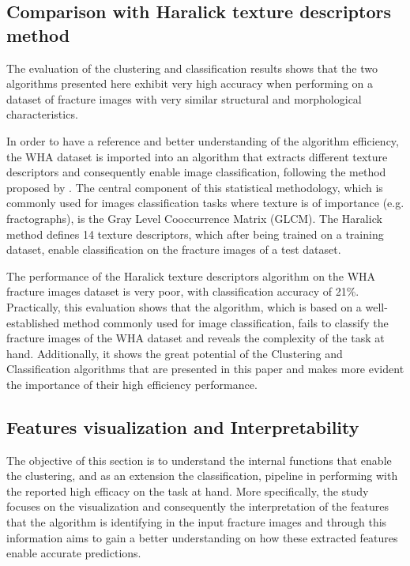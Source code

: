 \documentclass[authoryear,preprint,review,12pt, singleside]{elsarticle}
\begin{document}
\subsection{Comparison with Haralick texture descriptors method}

The evaluation of the clustering and classification results shows that the two algorithms presented here exhibit very high accuracy when performing on a dataset of fracture images with very similar structural and morphological characteristics. 

In order to have a reference and better understanding of the algorithm efficiency, the WHA dataset is imported into an algorithm that extracts different texture descriptors and consequently enable image classification, following the method proposed by \citet{haralick}. The central component of this statistical methodology, which is commonly used for images classification tasks where texture is of importance (e.g. fractographs), is the Gray Level Cooccurrence Matrix (GLCM). The Haralick method defines 14 texture descriptors, which after being trained on a training dataset, enable classification on the fracture images of a test dataset. 

The performance of the Haralick texture descriptors algorithm on the WHA fracture images dataset is very poor, with classification accuracy of 21\%. Practically, this evaluation shows that the algorithm, which is based on a well-established method commonly used  for image classification, fails to classify the fracture images of the WHA dataset and reveals the complexity of the task at hand. Additionally, it shows the great potential of the Clustering and Classification algorithms that are presented in this paper and makes more evident the importance of their high efficiency performance.        


\subsection{Features visualization and Interpretability}

The objective of this section is to understand the internal functions that enable the clustering, and as an extension the classification, pipeline in performing with the reported high efficacy on the task at hand. More specifically, the study focuses on the visualization and consequently the interpretation of the features that the algorithm is identifying in the input fracture images and through this information aims to gain a better understanding on how these extracted features enable accurate predictions. 
\end{document}
